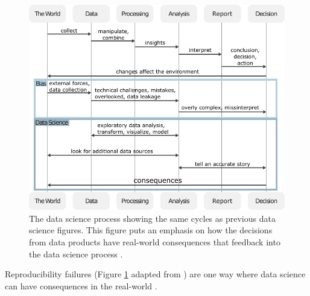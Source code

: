 \documentclass[../main.tex]{subfiles}
\begin{document}
    \begin{figure}[!hbtp]
        \centering
        \includegraphics[scale=0.5]{figs/050-intro/data_science_figure}
        \caption[Data Science and It's Consequences]{
        The data science process showing the same cycles as previous data science figures.
        This figure puts an emphasis on how the decisions from data products have real-world consequences that feedback into
        the data science process \cite{Chen2020}.
        }
        \label{fig:data_science_consequences}
    \end{figure}

    Reproducibility failures (Figure \ref{fig:data_science_consequences} adapted
    from \cite{ostblomOpinionatedPracticesTeaching2021}) are one way where data
    science can have consequences in the real-world
    \cite{aboumatarNoticeRetractionAboumatar2019, ExcelWhyUsing2020,
    ostblomOpinionatedPracticesTeaching2021,
    wallensteenRetractionNoticeEvaluation2018,
    whitehouseRetractionNoteComplex2021, zeebergMistakenIdentifiersGene2004,
    ziemannGeneNameErrors2016}.
\end{document}
